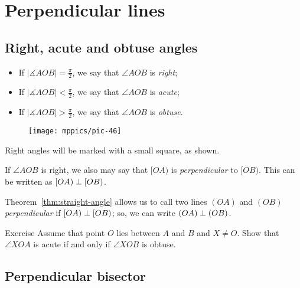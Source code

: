 \chapter{Perpendicular lines}\label{chap:perp}

\section{Right, acute and obtuse angles}

\begin{itemize}
\item If $|\measuredangle A O B|=\tfrac\pi2$, we say that $\angle A O B$ is \emph{right};
\item If $|\measuredangle A O B|<\tfrac\pi2$, we say that $\angle A O B$ is 
\emph{acute};
\item If $|\measuredangle A O B|>\tfrac\pi2$, we say that $\angle A O B$ is \emph{obtuse}.
\end{itemize}

\begin{wrapfigure}[2]{r}{25mm}
\vskip-25mm
\centering
\texttt{[image: mppics/pic-46]}
\end{wrapfigure}

Right angles will be marked with a small square, as shown.

If $\angle A O B$ is right, we also may say that $[O A)$ is \emph{perpendicular} to $[O B)$.
This can be written as $[O A)\perp [O B)$.

Theorem~\ref{thm:straight-angle} allows us to call two lines $(O A)$ and $(O B)$ {}\emph{perpendicular} if $[O A)\perp [O B)$; so, we can write $(O A)\perp (O B)$.



\begin{thm}{Exercise}\label{ex:acute-obtuce}
Assume that point $O$ lies between $A$ and $B$ and $X\ne O$.
Show that 
$\angle XOA$ is acute if and only if 
$\angle XOB$ is obtuse.
\end{thm}



\section{Perpendicular bisector}

